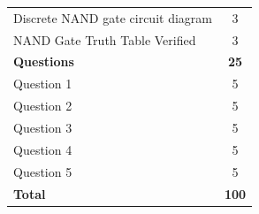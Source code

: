 \documentclass[12pt]{../manual}
\begin{document}
\begin{table}[ht!]
\begin{tabular}{l|c}
Discrete NAND gate circuit diagram & 3 \\
NAND Gate Truth Table Verified & 3 \\ \hline
{\bf Questions} & {\bf 25} \\ 
Question 1 & 5 \\
Question 2 & 5 \\
Question 3 & 5 \\
Question 4 & 5 \\
Question 5 & 5 \\ \hline \hline
{\bf Total}						& {\bf 100} \\ \hline
\end{tabular}
\end{table}
\vfill %
\end{document}
